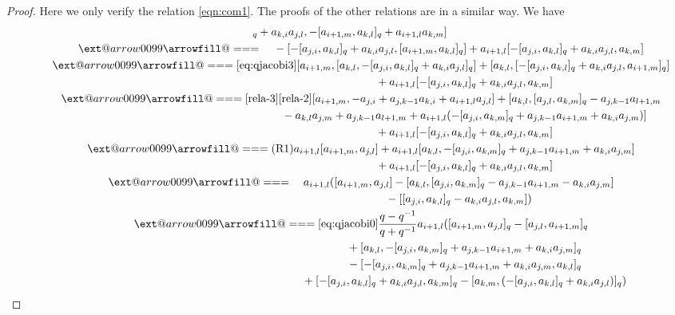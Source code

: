 \documentclass[10pt,a4paper]{amsart}
\makeatletter
\def\x@arrow{\DOTSB\Relbar}
\def\xlongequalsignfill@{\arrowfill@\x@arrow\Relbar\x@arrow}
\providecommand{\xlongequal}[2][]{%
	\ext@arrow 0099\xlongequalsignfill@{#1}{#2}}
\numberwithin{equation}{section}
\makeatother
\begin{document}
\begin{proof}
Here we only verify the relation \eqref{eqn:com1}.
The proofs of the other relations are in a similar way.
We have
\begin{gather*}
 [- [a_{j,i}, a_{k,l} ]_q+a_{k,i}a_{j,l}, - [a_{i+1,m}, a_{k,l} ]_q+a_{i+1,l}a_{k,m} ]\\
\qquad \xlongequal{\quad} {}- [- [a_{j,i}, a_{k,l} ]_q+a_{k,i}a_{j,l}, [a_{i+1,m}, a_{k,l} ]_q ]+a_{i+1,l} [- [a_{j,i}, a_{k,l} ]_q+a_{k,i}a_{j,l}, a_{k,m} ]\\
\qquad \xlongequal{\eqref{eq:qjacobi3}} [a_{i+1,m}, [a_{k,l}, - [a_{j,i}, a_{k,l} ]_q+a_{k,i}a_{j,l} ]_q ] + [a_{k,l}, [- [a_{j,i}, a_{k,l} ]_q+a_{k,i}a_{j,l}, a_{i+1,m} ]_q ]\\
\phantom{\qquad\xlongequal{\qquad}}{} +a_{i+1,l} [- [a_{j,i}, a_{k,l} ]_q+a_{k,i}a_{j,l}, a_{k,m} ]\\
\qquad \xlongequal[\eqref{rela-3}]{\eqref{rela-2}} [a_{i+1,m}, -a_{j,i}+a_{j,k-1}a_{k,i}+a_{i+1,l}a_{j,l} ]+ [a_{k,l}, [a_{j,l}, a_{k,m} ]_q-a_{j,k-1}a_{l+1,m} \\
\phantom{\qquad\xlongequal{\qquad}}{} -a_{k,l}a_{j,m}+a_{j,k-1}a_{l+1,m} +a_{i+1,l} (- [a_{j,i}, a_{k,m} ]_q +a_{j,k-1}a_{i+1,m} +a_{k,i}a_{j,m} ) ]\\
\phantom{\qquad\xlongequal{\qquad}}{} +a_{i+1,l} [- [a_{j,i}, a_{k,l} ]_q+a_{k,i}a_{j,l}, a_{k,m} ]\\
\qquad \xlongequal{(\textrm R1)} a_{i+1,l} [a_{i+1,m}, a_{j,l} ]+a_{i+1,l} [a_{k,l}, - [a_{j,i}, a_{k,m} ]_q+a_{j,k-1}a_{i+1,m}+a_{k,i}a_{j,m} ]\\
\phantom{\qquad\xlongequal{\qquad}}{} +a_{i+1,l} [- [a_{j,i}, a_{k,l} ]_q+a_{k,i}a_{j,l}, a_{k,m} ]\\
\qquad \xlongequal{\quad} a_{i+1,l} ( [a_{i+1,m}, a_{j,l} ]- [a_{k,l}, [a_{j,i}, a_{k,m} ]_q-a_{j,k-1}a_{i+1,m}-a_{k,i}a_{j,m} ] \\
 \phantom{\qquad \xlongequal{\quad}}{} - [ [a_{j,i}, a_{k,l} ]_q-a_{k,i}a_{j,l}, a_{k,m} ] )\\
 \qquad\xlongequal{\eqref{eq:qjacobi0}} \frac{q-q^{-1}}{q+q^{-1}}a_{i+1,l} ( [a_{i+1,m}, a_{j,l} ]_q- [a_{j,l}, a_{i+1,m} ]_q \\
\phantom{\qquad\xlongequal{\qquad}}{} + [a_{k,l}, - [a_{j,i}, a_{k,m} ]_q+a_{j,k-1}a_{i+1,m}+a_{k,i}a_{j,m} ]_q \\
\phantom{\qquad\xlongequal{\qquad}}{} - [ - [a_{j,i}, a_{k,m} ]_q+a_{j,k-1}a_{i+1,m}+a_{k,i}a_{j,m}, a_{k,l} ]_q \\
\phantom{\qquad\xlongequal{\qquad}}{} + [- [a_{j,i}, a_{k,l} ]_q+a_{k,i}a_{j,l}, a_{k,m} ]_q- [ a_{k,m}, (- [a_{j,i}, a_{k,l} ]_q+a_{k,i}a_{j,l} ) ]_q )\\

\end{gather*}
\end{proof}
\end{document}
